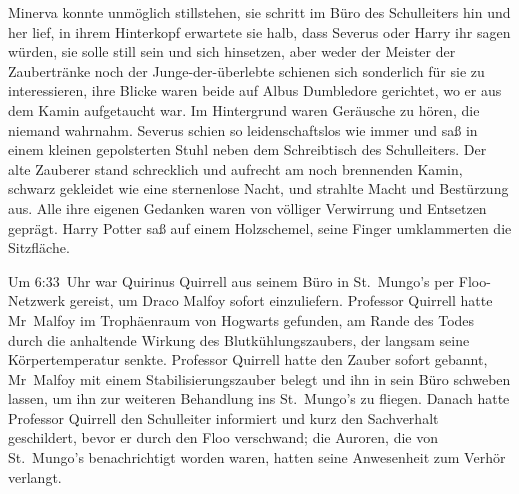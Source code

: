 Minerva konnte unmöglich stillstehen, sie schritt im Büro des Schulleiters hin und her lief, in ihrem Hinterkopf erwartete sie halb, dass Severus oder Harry ihr sagen würden, sie solle still sein und sich hinsetzen, aber weder der Meister der Zaubertränke noch der Junge-der-überlebte schienen sich sonderlich für sie zu interessieren, ihre Blicke waren beide auf Albus Dumbledore gerichtet, wo er aus dem Kamin aufgetaucht war. Im Hintergrund waren Geräusche zu hören, die niemand wahrnahm. Severus schien so leidenschaftslos wie immer und saß in einem kleinen gepolsterten Stuhl neben dem Schreibtisch des Schulleiters.
Der alte Zauberer stand schrecklich und aufrecht am noch brennenden Kamin, schwarz gekleidet wie eine sternenlose Nacht, und strahlte Macht und Bestürzung aus. Alle ihre eigenen Gedanken waren von völliger Verwirrung und Entsetzen geprägt. Harry Potter saß auf einem Holzschemel, seine Finger umklammerten die Sitzfläche.

Um 6:33~Uhr war Quirinus Quirrell aus seinem Büro in St.~Mungo’s per Floo-Netzwerk gereist, um Draco Malfoy sofort einzuliefern. Professor Quirrell hatte Mr~Malfoy im Trophäenraum von Hogwarts gefunden, am Rande des Todes durch die anhaltende Wirkung des Blutkühlungszaubers, der langsam seine Körpertemperatur senkte. Professor Quirrell hatte den Zauber sofort gebannt, Mr~Malfoy mit einem Stabilisierungszauber belegt und ihn in sein Büro schweben lassen, um ihn zur weiteren Behandlung ins St.~Mungo’s zu fliegen. Danach hatte Professor Quirrell den Schulleiter informiert und kurz den Sachverhalt geschildert, bevor er durch den Floo verschwand; die Auroren, die von St.~Mungo’s benachrichtigt worden waren, hatten seine Anwesenheit zum Verhör verlangt.

